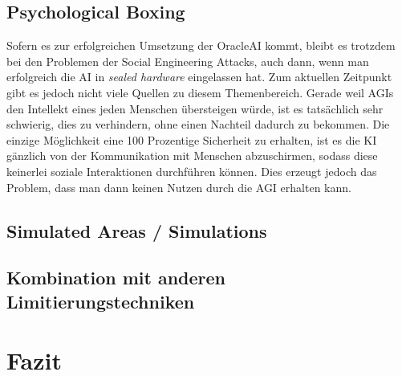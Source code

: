         \subsection{Psychological Boxing}

        Sofern es zur erfolgreichen Umsetzung der OracleAI kommt, bleibt es trotzdem bei den Problemen der Social
        Engineering Attacks, auch dann, wenn man erfolgreich die AI in \textit{sealed hardware} eingelassen hat.\cite[p. 4]{ebhardt2018threat}
        Zum aktuellen Zeitpunkt gibt es jedoch nicht viele Quellen zu diesem Themenbereich. Gerade weil AGIs den Intellekt
        eines jeden Menschen übersteigen würde, ist es tatsächlich sehr schwierig, dies zu verhindern, ohne einen Nachteil
        dadurch zu bekommen.\cite[p. 204]{yampolskiy2012leakproofing} Die einzige Möglichkeit eine 100 Prozentige Sicherheit
        zu erhalten, ist es die KI gänzlich von der Kommunikation mit Menschen abzuschirmen, sodass diese keinerlei
        soziale Interaktionen durchführen können. Dies erzeugt jedoch das Problem, dass man dann keinen Nutzen durch
        die AGI erhalten kann.


        \subsection{Simulated Areas / Simulations}
        \subsection{Kombination mit anderen Limitierungstechniken}
    \section{Fazit}

    \newpage
    
    

    \listoffigures


